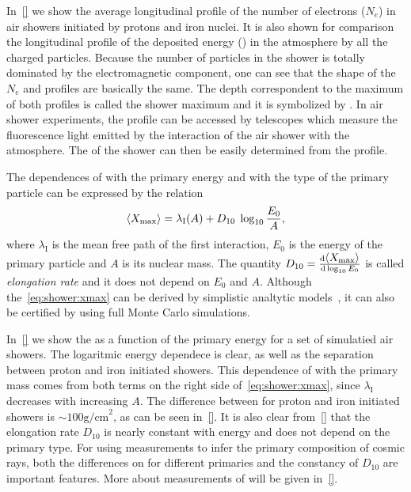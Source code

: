 In~\cref{} we show the average longitudinal profile of the number
of electrons ($N_e$) in air showers initiated by protons and iron nuclei.
It is also shown for comparison the longitudinal profile of the
deposited energy (\dEdX) in the atmosphere by all the charged particles.
Because the number of particles in the shower is totally dominated
by the electromagnetic component, one can see that the shape of the
$N_e$ and \dEdX profiles are basically the same.
The depth correspondent to the maximum of both profiles is called
the shower maximum and it is symbolized by \xmax. In air shower
experiments, the \dEdX profile can be accessed by telescopes which
measure the fluorescence light emitted by the interaction of the air shower
with the atmosphere. The \xmax of the shower can then be easily determined
from the \dEdX profile.

The dependences of \xmax with the primary energy and with the type
of the primary particle can be expressed by the relation
\begin{equation}
  \langle\mbox{$X_\text{max}$}\rangle = \lambda_\text{I}(A)+D_{10}\;\log_{10}\frac{E_0}{A},
  \label{eq:shower:xmax}
\end{equation}
where $\lambda_\text{I}$ is the mean free path of the first interaction,
$E_0$ is the energy of the primary particle and $A$ is its nuclear mass.
The quantity $D_{10} = \frac{ \text{d} \mbox{$\langle X_\text{max}\rangle$} }{ \text{d} \log_{10}E_0 }$
is called \emph{elongation rate} and it does not depend on $E_0$ and $A$.
Although the~\cref{eq:shower:xmax} can be derived by simplistic analtytic models~\cite{Matthews:2005sd},
it can also be certified by using full Monte Carlo simulations.

In~\cref{} we show the \xmaxmean as a function of the primary energy
for a set of simulatied air showers. The logaritmic energy dependece is clear,
as well as the separation between proton and iron initiated showers.
This dependence of \xmaxmean with the primary mass comes from both terms
on the right side of~\cref{eq:shower:xmax}, since $\lambda_\text{I}$
decreases with increasing $A$. The difference between \xmaxmean for
proton and iron initiated showers is $\sim 100 \text{g/cm}^2$, as can
be seen in~\cref{}. It is also clear from~\cref{} that the elongation rate
$D_{10}$ is nearly constant with energy and does not depend on the primary type.
For using \xmax measurements to infer the primary composition of
cosmic rays, both the differences on \xmax for different primaries and
the constancy of $D_{10}$ are important features. More about measurements
of \xmax will be given in~\cref{}. 


